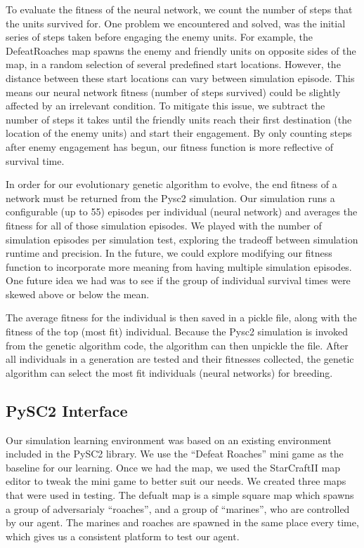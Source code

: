 \documentclass{article}
\begin{document}
\begin{multicols}{2}
To evaluate the fitness of the neural network, we count the number of steps that
the units survived for.  One problem we encountered and solved, was the initial
series of steps taken before engaging the enemy units. For example, the
DefeatRoaches map spawns the enemy and friendly units on opposite sides of the
map, in a random selection of several predefined start locations.  However, the
distance between these start locations can vary between simulation episode.
This means our neural network fitness (number of steps survived) could be
slightly affected by an irrelevant condition.  To mitigate this issue, we
subtract the number of steps it takes until the friendly units reach their first
destination (the location of the enemy units) and start their engagement. By
only counting steps after enemy engagement has begun, our fitness function is
more reflective of survival time.

In order for our evolutionary genetic algorithm to evolve, the end fitness of a
network must be returned from the Pysc2 simulation.  Our simulation runs a
configurable (up to 55) episodes per individual (neural network) and averages
the fitness for all of those simulation episodes. We played with the number of
simulation episodes per simulation test, exploring the tradeoff between
simulation runtime and precision.  In the future, we could explore modifying our
fitness function to incorporate more meaning from having multiple simulation
episodes.  One future idea we had was to see if the group of individual survival
times were skewed above or below the mean.

The average fitness for the individual is then saved in a pickle file, along
with the fitness of the top (most fit) individual.  Because the Pysc2 simulation
is invoked from the genetic algorithm code, the algorithm can then unpickle the
file.  After all individuals in a generation are tested and their fitnesses
collected, the genetic algorithm can select the most fit individuals (neural
networks) for breeding.

\subsection{PySC2 Interface}
Our simulation learning environment was based on an existing environment
included in the PySC2 library\cite{pysc2}. We use the ``Defeat Roaches'' mini
game as the baseline for our learning. Once we had the map, we used the
StarCraftII map editor to tweak the mini game to better suit our needs. We
created three maps that were used in testing. The defualt map is a simple square
map which spawns a group of adversarialy ``roaches'', and a group of ``marines'',
who are controlled by our agent. The marines and roaches are spawned in the
same place every time, which gives us a consistent platform to test our agent.


\end{multicols}
\end{document}
